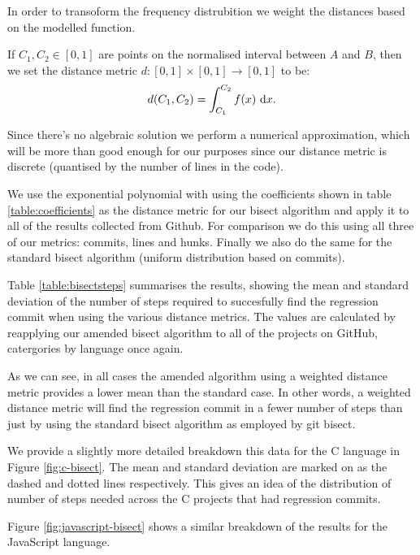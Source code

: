 \documentclass[10pt,journal,compsoc]{IEEEtran}
\begin{document}
In order to transoform the frequency distrubition we weight the distances based on the modelled function.

If $C_1, C_2 \in [0, 1]$ are points on the normalised interval between $A$ and $B$, then we set the distance metric $d : [0, 1] \times [ 0, 1 ] \to [ 0, 1 ]$ to be:
$$
d(C_1, C_2) = \int_{C_1}^{C_2} f(x) \ {\rm d}x .
$$

Since there's no algebraic solution we perform a numerical approximation, which will be more than good enough for our purposes since our distance metric is discrete (quantised by the number of lines in the code).

We use the exponential polynomial with using the coefficients shown in table \ref{table:coefficients} as the distance metric for our bisect algorithm and apply it to all of the results collected from Github. For comparison we do this using all three of our metrics: commits, lines and hunks. Finally we also do the same for the standard bisect algorithm (uniform distribution based on commits).

Table \ref{table:bisectsteps} summarises the results, showing the mean and standard deviation of the number of steps required to succesfully find the regression commit when using the various distance metrics. The values are calculated by reapplying our amended bisect algorithm to all of the projects on GitHub, catergories by language once again.

As we can see, in all cases the amended algorithm using a weighted distance metric provides a lower mean than the standard case. In other words, a weighted distance metric will find the regression commit in a fewer number of steps than just by using the standard bisect algorithm as employed by {\code git bisect}.

We provide a slightly more detailed breakdown this data for the C language in Figure \ref{fig:c-bisect}. The mean and standard deviation are marked on as the dashed and dotted lines respectively. This gives an idea of the distribution of number of steps needed across the C projects that had regression commits.

Figure \ref{fig:javascript-bisect} shows a similar breakdown of the results for the JavaScript language.
\end{document}
